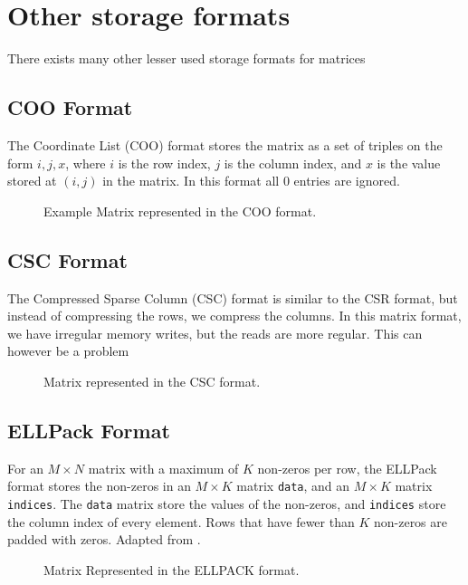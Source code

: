 \section{Other storage formats}
There exists many other lesser used storage formats for matrices

\subsection{COO Format}
The Coordinate List (COO) format stores the matrix as a set of triples on the form \(i,j,x\), where \(i\) is the row index, \(j\) is the column index, and \(x\) is the value stored at \((i,j)\) in the matrix. In this format all \(0\) entries are ignored.

\begin{figure}[H]
    \centering
    \caption{Example Matrix represented in the COO format.}
    \label{fig:cooformat}
\end{figure}


\subsection{CSC Format}
The Compressed Sparse Column (CSC) format is similar to the CSR format, but instead of compressing the rows, we compress the columns. In this matrix format, we have irregular memory writes, but the reads are more regular. This can however be a problem

\begin{figure}[H]
    \centering
    \caption{Matrix represented in the CSC format.}
    \label{fig:cscformat}
\end{figure}

\subsection{ELLPack Format}
For an \(M \times  N\) matrix with a maximum of \(K\) non-zeros per row, the ELLPack format stores the non-zeros in an \(M \times  K\) matrix \texttt{data}, and an \(M \times  K\) matrix \texttt{indices}. The \texttt{data} matrix store the values of the non-zeros, and \texttt{indices} store the column index of every element. Rows that have fewer than \(K\) non-zeros are padded with zeros. Adapted from \cite{ellpackformat}.

\begin{figure}[ht]
    \centering
    \caption{Matrix Represented in the ELLPACK format.}
    \label{fig:ellpackformat}
\end{figure}


